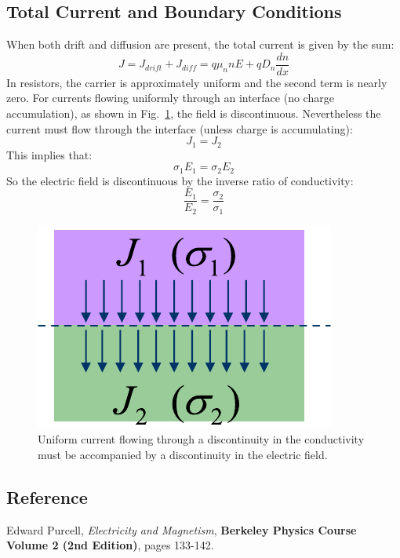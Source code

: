 \subsection{Total Current and Boundary Conditions}
When both drift and diffusion are present, the total current is given by the sum:
\begin{equation}
        J = {J_{drift}} + {J_{diff}} = q{\mu _n}nE + q{D_n}\frac{{dn}}{{dx}}
\end{equation}
In resistors, the carrier is approximately uniform and the second term is nearly zero. For currents flowing uniformly through an interface (no charge accumulation), as shown in Fig.~\ref{fig:slide50}, the field is discontinuous.  Nevertheless the current must flow through the interface (unless charge is accumulating):
\begin{equation} {J_1} = {J_2}\end{equation}
This implies that:
\begin{equation}{\sigma _1}{E_1} = {\sigma _2}{E_2}\end{equation}
So the electric field is discontinuous by the inverse ratio of conductivity:
\begin{equation}\frac{{{E_1}}}{{{E_2}}} = \frac{{{\sigma _2}}}{{{\sigma _1}}}\end{equation}
\begin{figure}[tb]
\begin{center}
\includegraphics[width=.25\columnwidth]{slide50}
\end{center}
\caption{Uniform current flowing through a discontinuity in the conductivity must be accompanied by a discontinuity in the electric field. }
\label{fig:slide50}
\end{figure}
\subsection{Reference}
Edward Purcell, \textit{Electricity and Magnetism}, \textbf{Berkeley Physics Course Volume 2 (2nd Edition)}, pages 133-142.

